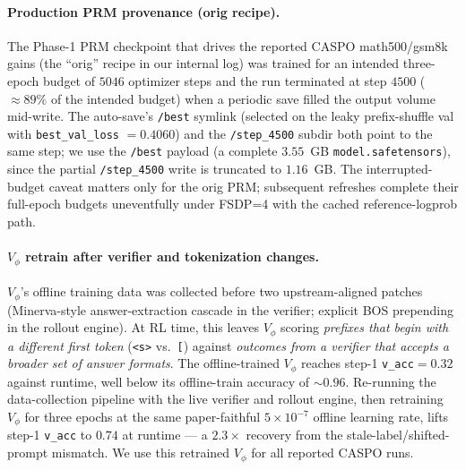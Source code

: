 \documentclass[11pt]{article}
\newcommand{\caspo}{\textsc{CASPO}}
\begin{document}
\paragraph{Production PRM provenance (orig recipe).}
The Phase-1 PRM checkpoint that drives the reported \caspo{}
math500/gsm8k gains (the ``orig'' recipe in our internal log) was
trained for an intended three-epoch budget of $5046$ optimizer steps
and the run terminated at step $4500$ (${\approx}89\%$ of the
intended budget) when a periodic save filled the output volume mid-write.
The auto-save's \texttt{/best} symlink (selected on the leaky
prefix-shuffle val with \texttt{best\_val\_loss} ${=}0.4060$) and the
\texttt{/step\_4500} subdir both point to the same step; we use the
\texttt{/best} payload (a complete $3.55$~GB
\texttt{model.safetensors}), since the partial \texttt{/step\_4500}
write is truncated to $1.16$~GB. The interrupted-budget caveat
matters only for the orig PRM; subsequent refreshes complete their
full-epoch budgets uneventfully under FSDP=4 with the cached
reference-logprob path.

\paragraph{$V_\phi$ retrain after verifier and tokenization changes.}
$V_\phi$'s offline training data was collected before two upstream-aligned
patches (Minerva-style answer-extraction cascade in the verifier;
explicit BOS prepending in the rollout engine). At RL time, this leaves
$V_\phi$ scoring \emph{prefixes that begin with a different first token}
(\texttt{<s>} vs.~\texttt{[}) against \emph{outcomes from a verifier that
accepts a broader set of answer formats}. The offline-trained $V_\phi$
reaches step-1 \texttt{v\_acc}$=0.32$ against runtime, well below its
offline-train accuracy of $\sim 0.96$. Re-running the data-collection
pipeline with the live verifier and rollout engine, then retraining
$V_\phi$ for three epochs at the same paper-faithful $5{\times}10^{-7}$
offline learning rate, lifts step-1 \texttt{v\_acc} to $0.74$ at
runtime --- a $2.3\times$ recovery from the stale-label/shifted-prompt
mismatch. We use this retrained $V_\phi$ for all reported \caspo{} runs.
\end{document}
